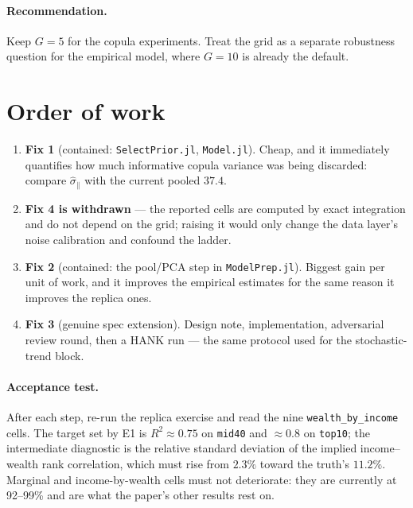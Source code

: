 \documentclass[11pt]{article}
\newcommand{\code}[1]{\texttt{#1}}
\begin{document}
\paragraph{Recommendation.} Keep $G=5$ for the copula experiments. Treat the
grid as a separate robustness question for the empirical model, where $G=10$ is
already the default.

\section{Order of work}\label{sec:order}

\begin{enumerate}[label=\textbf{\arabic*.}]
  \item \textbf{Fix 1} (contained: \code{SelectPrior.jl}, \code{Model.jl}).
        Cheap, and it immediately quantifies how much informative copula
        variance was being discarded: compare $\hat\sigma_\parallel$ with the
        current pooled $37.4$.
  \item \textbf{Fix 4 is withdrawn} --- the reported cells are computed by
        exact integration and do not depend on the grid; raising it would only
        change the data layer's noise calibration and confound the ladder.
  \item \textbf{Fix 2} (contained: the pool/PCA step in \code{ModelPrep.jl}).
        Biggest gain per unit of work, and it improves the empirical estimates
        for the same reason it improves the replica ones.
  \item \textbf{Fix 3} (genuine spec extension). Design note, implementation,
        adversarial review round, then a HANK run --- the same protocol used for
        the stochastic-trend block.
\end{enumerate}

\paragraph{Acceptance test.} After each step, re-run the replica exercise and
read the nine \texttt{wealth\_by\_income} cells. The target set by E1 is
$R^2 \approx 0.75$ on \texttt{mid40} and $\approx 0.8$ on \texttt{top10}; the
intermediate diagnostic is the relative standard deviation of the implied
income--wealth rank correlation, which must rise from $2.3\%$ toward the truth's
$11.2\%$. Marginal and income-by-wealth cells must not deteriorate: they are
currently at 92--99\% and are what the paper's other results rest on.
\end{document}
